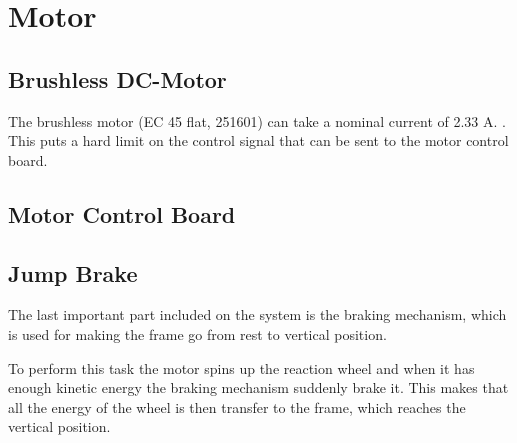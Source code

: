 \section{Motor}
\label{sec:Motor}


\subsection{Brushless DC-Motor}
The brushless motor (EC 45 flat, 251601) can take a nominal current of 2.33 A.\cite{MaxonMotors} . This puts a hard limit on the control signal that can be sent to the motor control board. 



\subsection{Motor Control Board}


\subsection{Jump Brake}
The last important part included on the system is the braking mechanism, which is used for making the frame go from rest to vertical position. 

To perform this task the motor spins up the reaction wheel and when it has enough kinetic energy the braking mechanism suddenly brake it. This makes that all the energy of the wheel is then transfer to the frame, which reaches the vertical position.
